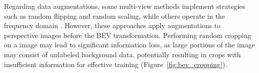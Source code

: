 Regarding  data augmentations, some multi-view methods implement strategies such as random flipping and random scaling, while others operate in the frequency domain \cite{HSDA}. However, these approaches apply augmentations to perspective images before the BEV transformation. Performing random cropping on a  image may lead to significant information loss, as large portions of the image may consist of unlabeled background data, potentially resulting in crops with insufficient information for effective training (Figure~\ref{fig:bev_cropping}). 

\begin{figure}[h]
    \centering
    \setlength{\tabcolsep}{1pt}  %
    \renewcommand{\arraystretch}{0.5}
    \begin{tabular}{c c c c c c c c}


\end{tabular}
\end{figure}
